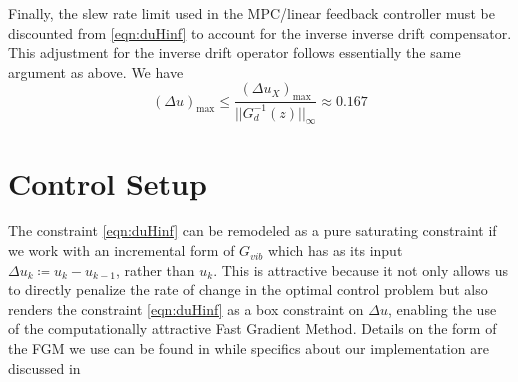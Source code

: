 \documentclass[journal,twocolumn,twoside]{IEEEtran}
\begin{document}
Finally, the slew rate limit used in the MPC/linear feedback controller must be discounted from \eqref{eqn:duHinf} to account for the inverse inverse drift compensator. This adjustment for the inverse drift operator follows essentially the same argument as above. We have
\begin{equation}
  (\Delta u)_{\text{max}} \leq \frac{(\Delta u_X)_{\text{max}}}{||G^{-1}_d(z)||_{\infty}} \approx 0.167
\end{equation}

\section{Control Setup}
The constraint \eqref{eqn:duHinf} can be remodeled as a pure saturating constraint if we work with an incremental form of \(G_{vib}\) which has as its input \({\Delta u_k\coloneqq u_k-u_{k-1}}\), rather than \(u_k\). This is attractive because it not only allows us to directly penalize the rate of change in the optimal control problem but also renders the constraint \eqref{eqn:duHinf} as a box constraint on $\Delta u$, enabling the use of the computationally attractive Fast Gradient Method. Details on the form of the FGM we use can be found in \cite{Jerez_Trans_2014, jerez_embedded_2013} while specifics about our implementation are discussed in \cite{braker_application_2017}
\end{document}
